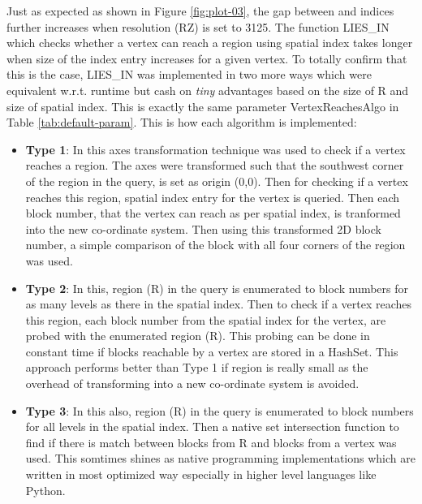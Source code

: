 Just as expected as shown in Figure \ref{fig:plot-03}, the gap between {\rrp} and {\rrpsocial} indices further increases when resolution (RZ) is set to 3125. The function LIES\_IN which checks whether a vertex can reach a region using spatial index takes longer when size of the index entry increases for a given vertex. To totally confirm that this is the case, LIES\_IN was implemented in two more ways which were equivalent w.r.t. runtime but cash on \textit{tiny} advantages based on the size of R and size of spatial index. This is exactly the same parameter VertexReachesAlgo in Table \ref{tab:default-param}. This is how each algorithm is implemented:
\begin{itemize}
  \item \textbf{Type 1}: In this axes transformation technique was used to check if a vertex reaches a region. The axes were transformed such that the southwest corner of the region in the query, is set as origin (0,0). Then for checking if a vertex reaches this region, spatial index entry for the vertex is queried. Then each block number, that the vertex can reach as per spatial index, is tranformed into the new co-ordinate system. Then using this transformed 2D block number, a simple comparison of the block with all four corners of the region was used.
  \item \textbf{Type 2}: In this, region (R) in the query is enumerated to block numbers for as many levels as there in the spatial index. Then to check if a vertex reaches this region, each block number from the spatial index for the vertex, are probed with the enumerated region (R). This probing can be done in constant time if blocks reachable by a vertex are stored in a HashSet. This approach performs better than Type 1 if region is really small as the overhead of transforming into a new co-ordinate system is avoided.
  \item \textbf{Type 3}: In this also, region (R) in the query is enumerated to block numbers for all levels in the spatial index. Then a native set intersection function to find if there is match between blocks from R and blocks from a vertex was used. This somtimes shines as native programming implementations which are written in most optimized way especially in higher level languages like Python.
\end{itemize}

